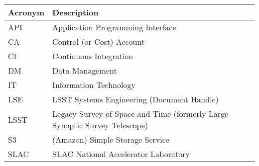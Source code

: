 \addtocounter{table}{-1}
\begin{longtable}{p{}p{}}\hline
\textbf{Acronym} & \textbf{Description}  \\\hline

API & Application Programming Interface \\\hline
CA & Control (or Cost) Account \\\hline
CI & Continuous Integration \\\hline
DM & Data Management \\\hline
IT & Information Technology \\\hline
LSE & LSST Systems Engineering (Document Handle) \\\hline
LSST & Legacy Survey of Space and Time (formerly Large Synoptic Survey Telescope) \\\hline
S3 & (Amazon) Simple Storage Service  \\\hline
SLAC & SLAC National Accelerator Laboratory \\\hline
\end{longtable}
